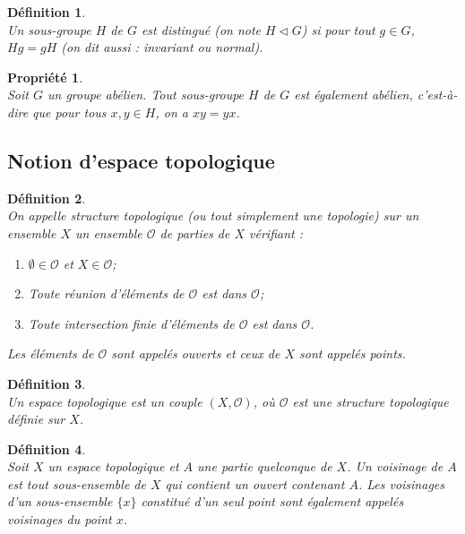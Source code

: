 \documentclass[a4paper, 14pt]{report}
\newtheorem{definition}{Définition}[section]
\newtheorem{propriety}{Propriété}[section]
\begin{document}
\begin{onehalfspace}
{			\begin{definition} \cite{ribet2004graduate}\\
				Un sous-groupe \( H \) de \( G \) est \emph{distingué} (on note \( H \triangleleft G \)) si pour tout \( g \in G \), \( Hg = gH \) (on dit aussi : invariant ou normal).
			\end{definition}
			
			\begin{propriety} \cite{ribet2004graduate}\\
				Soit \( G \) un groupe abélien. Tout sous-groupe \( H \) de \( G \) est également abélien, c'est-à-dire que pour tous \( x, y \in H \), on a \( xy = yx \).
			\end{propriety}
			
			
			
			
			
			\subsection{Notion d'espace topologique}
			
			\begin{definition} \cite{bourbaki2013general} \\
				On appelle structure \textit{topologique} (ou tout simplement une topologie) sur un ensemble \( X \) un ensemble \( \mathcal{O} \) de parties de \( X \) vérifiant :
				\begin{enumerate} [label=\roman*)]
					\item \( \emptyset \in \mathcal{O} \) et \( X \in \mathcal{O} \);
					\item Toute réunion d'éléments de \( \mathcal{O} \) est dans \( \mathcal{O} \);
					\item Toute intersection finie d'éléments de \( \mathcal{O} \) est dans \( \mathcal{O} \).
				\end{enumerate}
				Les éléments de \( \mathcal{O} \) sont appelés \textit{ouverts} et ceux de  \( X \) sont appelés \textit{points}.
			\end{definition}
			
			
			\begin{definition} \cite{bourbaki2013general} \\
				Un espace topologique est un couple \( (X, \mathcal{O}) \), où \( \mathcal{O} \) est une structure topologique définie sur \( X  \).
			\end{definition}
			
			\begin{definition}  \cite{bourbaki2013general} \\
				Soit \( X \) un espace topologique et \( A \) une partie quelconque de \( X \). Un voisinage de \( A \) est tout sous-ensemble de \( X \) qui contient un ouvert contenant \( A \). Les voisinages d'un sous-ensemble \( \{ x \} \) constitué d'un seul point sont également appelés voisinages du point \( x \).
			\end{definition}
			
}
\end{onehalfspace}
\end{document}
